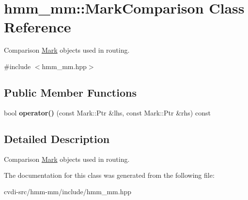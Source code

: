 \hypertarget{classhmm__mm_1_1MarkComparison}{}\section{hmm\+\_\+mm\+:\+:Mark\+Comparison Class Reference}
\label{classhmm__mm_1_1MarkComparison}


Comparison \hyperlink{classhmm__mm_1_1Mark}{Mark} objects used in routing.  




{\ttfamily \#include $<$hmm\+\_\+mm.\+hpp$>$}

\subsection*{Public Member Functions}
\begin{DoxyCompactItemize}
\item 
bool {\bfseries operator()} (const Mark\+::\+Ptr \&lhs, const Mark\+::\+Ptr \&rhs) const \hypertarget{classhmm__mm_1_1MarkComparison_a249280c0776b8e8e927301aafdbfccbc}{}\label{classhmm__mm_1_1MarkComparison_a249280c0776b8e8e927301aafdbfccbc}

\end{DoxyCompactItemize}


\subsection{Detailed Description}
Comparison \hyperlink{classhmm__mm_1_1Mark}{Mark} objects used in routing. 

The documentation for this class was generated from the following file\+:\begin{DoxyCompactItemize}
\item 
cvdi-\/src/hmm-\/mm/include/hmm\+\_\+mm.\+hpp\end{DoxyCompactItemize}
